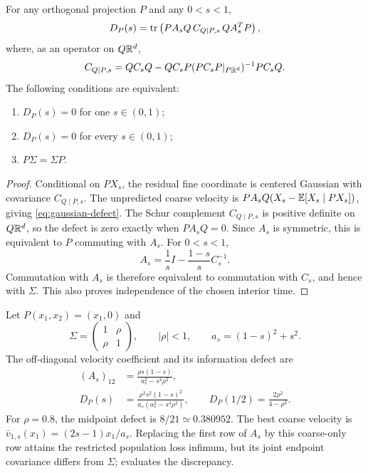 \begin{theorem}\label{thm:gaussian-commutation}
For any orthogonal projection $P$ and any $0<s<1$,
\begin{equation}\label{eq:gaussian-defect}
 D_P(s)=\operatorname{tr}\left(PA_sQ\,C_{Q\mid P,s}\,QA_s^TP\right),
\end{equation}
where, as an operator on $Q\mathbb R^d$,
\begin{equation}
 C_{Q\mid P,s}=QC_sQ-QC_sP(PC_sP|_{P\mathbb R^d})^{-1}PC_sQ.
\end{equation}
The following conditions are equivalent:
\begin{enumerate}[label=(\roman*)]
\item $D_P(s)=0$ for one $s\in(0,1)$;
\item $D_P(s)=0$ for every $s\in(0,1)$;
\item $P\Sigma=\Sigma P$.
\end{enumerate}
\end{theorem}
\begin{proof}
Conditional on $PX_s$, the residual fine coordinate is centered Gaussian with covariance $C_{Q\mid P,s}$. The unpredicted coarse velocity is $PA_sQ(X_s-\mathbb E[X_s\mid PX_s])$, giving \eqref{eq:gaussian-defect}. The Schur complement $C_{Q\mid P,s}$ is positive definite on $Q\mathbb R^d$, so the defect is zero exactly when $PA_sQ=0$. Since $A_s$ is symmetric, this is equivalent to $P$ commuting with $A_s$. For $0<s<1$,
\begin{equation}
 A_s=\frac1sI-\frac{1-s}{s}C_s^{-1}.
\end{equation}
Commutation with $A_s$ is therefore equivalent to commutation with $C_s$, and hence with $\Sigma$. This also proves independence of the chosen interior time.
\end{proof}

\begin{example}\label{ex:gaussian}
Let $P(x_1,x_2)=(x_1,0)$ and
\begin{equation}
 \Sigma=\begin{pmatrix}1&\rho\\\rho&1\end{pmatrix},\qquad |\rho|<1,
 \qquad a_s=(1-s)^2+s^2.
\end{equation}
The off-diagonal velocity coefficient and its information defect are
\begin{align}\label{eq:rho-defect}
 (A_s)_{12}&=\frac{\rho s(1-s)}{a_s^2-s^4\rho^2},\\
 D_P(s)&=\frac{\rho^2s^2(1-s)^2}{a_s(a_s^2-s^4\rho^2)},
 \qquad D_P(1/2)=\frac{2\rho^2}{4-\rho^2}.
\end{align}
For $\rho=0.8$, the midpoint defect is $8/21\simeq0.380952$. The best coarse velocity is $\bar v_{1,s}(x_1)=(2s-1)x_1/a_s$. Replacing the first row of $A_s$ by this coarse-only row attains the restricted population loss infimum, but its joint endpoint covariance differs from $\Sigma$;  evaluates the discrepancy.
\end{example}

